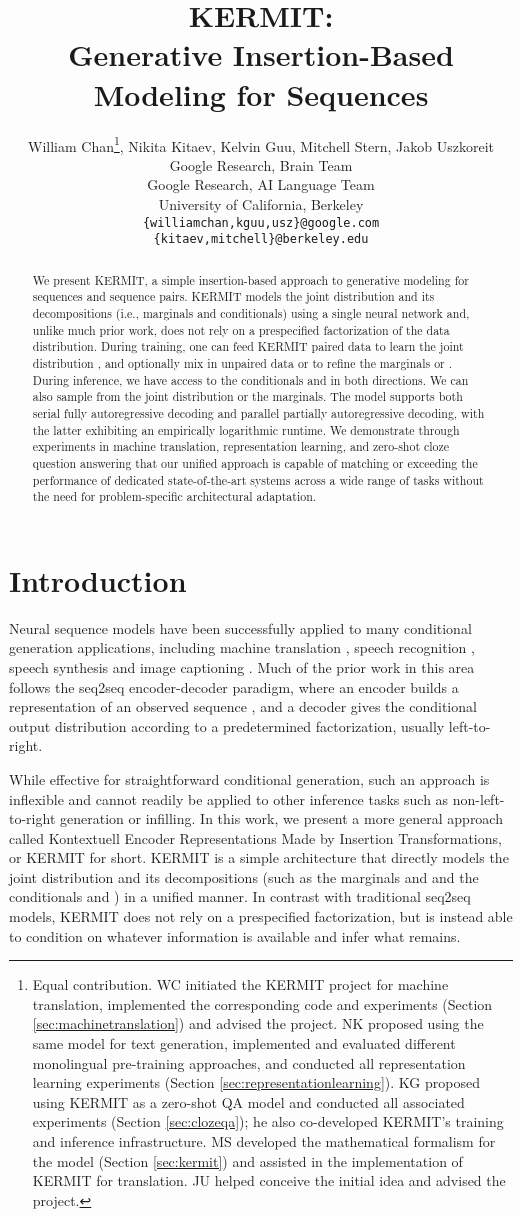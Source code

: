 \documentclass{article}
\title{KERMIT: \\ Generative Insertion-Based Modeling for Sequences}
\author{William Chan\thanks{Equal contribution. WC initiated the KERMIT project for machine translation, implemented the corresponding code and experiments (Section \ref{sec:machinetranslation}) and advised the project. NK proposed using the same model for text generation, implemented and evaluated different monolingual pre-training approaches, and conducted all representation learning experiments (Section \ref{sec:representationlearning}). KG proposed using KERMIT as a zero-shot QA model and conducted all associated experiments (Section \ref{sec:clozeqa}); he also co-developed KERMIT's training and inference infrastructure. MS developed the mathematical formalism for the model (Section \ref{sec:kermit}) and assisted in the implementation of KERMIT for translation. JU helped conceive the initial idea and advised the project.}\hspace{1.75mm},
  Nikita Kitaev\footnotemark[1]\hspace{1.75mm},
  Kelvin Guu\footnotemark[1]\hspace{1.75mm},
  Mitchell Stern\footnotemark[1]\hspace{1.75mm},
  Jakob Uszkoreit \\
  Google Research, Brain Team \\
  Google Research, AI Language Team \\
  University of California, Berkeley \\
  \texttt{\{williamchan,kguu,usz\}@google.com} \\
  \texttt{\{kitaev,mitchell\}@berkeley.edu} \\
}
\begin{document}
\maketitle

\begin{abstract}
We present KERMIT, a simple insertion-based approach to generative modeling for sequences and sequence pairs. KERMIT models the joint distribution and its decompositions (i.e., marginals and conditionals) using a single neural network and, unlike much prior work, does not rely on a prespecified factorization of the data distribution. During training, one can feed KERMIT paired data  to learn the joint distribution , and optionally mix in unpaired data  or  to refine the marginals  or . During inference, we have access to the conditionals  and  in both directions. We can also sample from the joint distribution or the marginals. The model supports both serial fully autoregressive decoding and parallel partially autoregressive decoding, with the latter exhibiting an empirically logarithmic runtime. We demonstrate through experiments in machine translation, representation learning, and zero-shot cloze question answering that our unified approach is capable of matching or exceeding the performance of dedicated state-of-the-art systems across a wide range of tasks without the need for problem-specific architectural adaptation.
\end{abstract}

\section{Introduction}
\label{sec:introduction}

Neural sequence models \citep{sutskever-nips-2014,cho-emnlp-2014} have been successfully applied to many conditional generation applications, including machine translation \citep{bahdanau-iclr-2015,luong-emnlp-2015}, speech recognition \citep{chan-icassp-2016,bahdanau-icassp-2016}, speech synthesis \citep{oord-arxiv-2016,wang-interspeech-2017} and image captioning \citep{vinyals-cvpr-2015,xu-icml-2015}.
Much of the prior work in this area follows the seq2seq encoder-decoder paradigm, where an encoder builds a representation of an observed sequence , and a decoder gives the conditional output distribution  according to a predetermined factorization, usually left-to-right.

While effective for straightforward conditional generation, such an approach is inflexible and cannot readily be applied to other inference tasks such as non-left-to-right generation or infilling. In this work, we present a more general approach called Kontextuell Encoder Representations Made by Insertion Transformations, or KERMIT for short. KERMIT is a simple architecture that directly models the joint distribution  and its decompositions (such as the marginals  and  and the conditionals  and ) in a unified manner. In contrast with traditional seq2seq models, KERMIT does not rely on a prespecified factorization, but is instead able to condition on whatever information is available and infer what remains.
\end{document}
